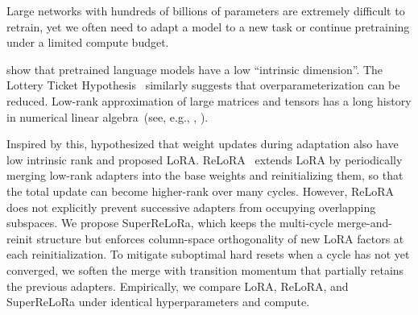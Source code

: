 Large networks with hundreds of billions of parameters are extremely difficult to retrain, yet we often need to adapt a model to a new task or continue pretraining under a limited compute budget.

\cite{aghajanyan2020intrinsic} show that pretrained language models have a low ``intrinsic dimension''.
The Lottery Ticket Hypothesis~\cite{frankle2019lottery} similarly suggests that overparameterization can be reduced.
Low-rank approximation of large matrices and tensors has a long history in numerical linear algebra~(see, e.g., \citet{lubich2013projectorsplitting}, \citet{sulz2023numerical}).

Inspired by this, \cite{hu2021lora} hypothesized that weight updates during adaptation also have low intrinsic rank and proposed LoRA.
ReLoRA~\cite{lialin2023stack} extends LoRA by periodically merging low-rank adapters into the base weights and reinitializing them, so that the total update can become higher-rank over many cycles.
However, ReLoRA does not explicitly prevent successive adapters from occupying overlapping subspaces.
We propose SuperReLoRa, which keeps the multi-cycle merge-and-reinit structure but enforces column-space orthogonality of new LoRA factors at each reinitialization.
To mitigate suboptimal hard resets when a cycle has not yet converged, we soften the merge with transition momentum that partially retains the previous adapters.
Empirically, we compare LoRA, ReLoRA, and SuperReLoRa under identical hyperparameters and compute.
